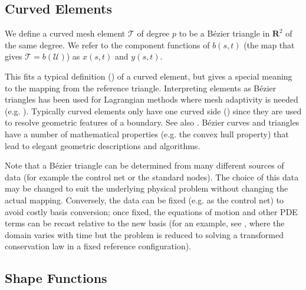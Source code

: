 \documentclass[letterpaper,10pt]{article}
\theoremstyle{definition}
\newcommand{\reals}{\mathbf{R}}
\newcommand{\utri}{\mathcal{U}}
\begin{document}
\subsection{Curved Elements}\label{sec:curved-elements}

We define a curved mesh element \(\mathcal{T}\) of degree \(p\)
to be a B\'{e}zier triangle in \(\reals^2\) of the same degree.
We refer to the component functions of \(b(s, t)\) (the map that
gives \(\mathcal{T} = b\left(\utri\right)\)) as \(x(s, t)\) and \(y(s, t)\).

This fits a typical definition (\cite[Chapter~12]{FEM-ClaesJohnson})
of a curved element, but gives a special meaning to the mapping from
the reference triangle. Interpreting elements as B\'{e}zier triangles
has been used for Lagrangian methods where
mesh adaptivity is needed (e.g. \cite{CardozeMOP04}). Typically curved
elements only have one curved side (\cite{McLeod1972}) since they are used
to resolve geometric features of a boundary. See also
\cite{Zlmal1973, Zlmal1974}.
B\'{e}zier curves and triangles have a number of mathematical properties
(e.g. the convex hull property) that lead to elegant geometric
descriptions and algorithms.

Note that a B\'{e}zier triangle can be
determined from many different sources of data (for example the control net
or the standard nodes). The choice of this data may be changed to suit the
underlying physical problem without changing the actual mapping. Conversely,
the data can be fixed (e.g. as the control net) to avoid costly basis
conversion; once fixed, the equations of motion and other PDE terms can
be recast relative to the new basis (for an example, see \cite{Persson2009},
where the domain varies with time but the problem is reduced to
solving a transformed conservation law in a fixed reference configuration).

\subsection{Shape Functions}\label{subsec:shape-functions}
\end{document}
